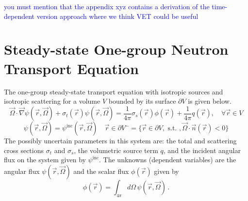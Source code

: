 \documentclass[12pt]{report}
\newcommand{\vr}{\vec{r}}
\newcommand{\vO}{\vec{\Omega}}
\newcommand{\grad}{\vec{\nabla}}
\newcommand{\sigt}{\sigma_t}
\newcommand{\sigs}{\sigma_s}
\newcommand{\comment}[2]{\marginpar{\textcolor{#2}{$\star$}}\textcolor{#2}{#1}\newline}
\newcommand{\jcr}[1]{\comment{#1}{blue}}
\newcommand{\jcr}[1]{\phantom{a}}
\begin{document}
\jcr{you must mention that the appendix xyz contains a derivation of the time-dependent version approach where we think VET could be useful}

\section{Steady-state One-group Neutron Transport Equation}

The one-group steady-state transport equation with isotropic sources and isotropic scattering for a volume $V$ bounded by its surface $\partial V$ is given below.
\begin{equation}
\label{SS1GTE}
\vO \cdot \grad \psi(\vr,\vO) + \sigt(\vr) \psi(\vr,\vO) = \frac{1}{4 \pi} \sigs(\vr) \phi(\vr) + \frac{1}{4 \pi} q(\vr), \quad \forall \vr \in V
\end{equation}
\begin{equation}
\label{SS1GTE_bc}
\psi(\vr,\vO) = \psi^{\text{inc}}(\vr,\vO) \quad \vr \in \partial V^{-} = \{ \vr \in \partial V, \text{ s.t. }, \vO \cdot \vec{n}(\vr) < 0\}
\end{equation}
The possibly uncertain parameters in this system are: the total and scattering cross sections $\sigt$ and $\sigs$, the volumetric source term $q$, and the incident angular flux on the system given by $\psi^{\text{inc}}$. The unknowns (dependent variables) are the angular flux $\psi(\vr,\vO)$ and the scalar flux $\phi(\vr)$ given by
\[
\phi(\vr) = \int_{4\pi}d\Omega\,\psi(\vr,\vO) \,.
\]

\end{document}
